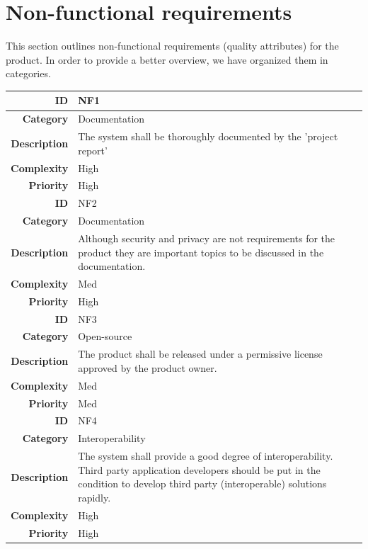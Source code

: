\newpage
\section{Non-functional requirements}
\label{section:nonfunctionalreq}

This section outlines non-functional requirements (quality attributes) for the product.
In order to provide a better overview, we have organized them in categories.


\begin{table}[H]
\begin{center}
\begin{tabular}{ | r | p{11.5cm} | }
  \hline
  
  \textbf{ID} & NF1 \\
  \hline\noalign{\smallskip}\hline
  \textbf{Category}			&	Documentation\\
  \textbf{Description}	& The system shall be thoroughly documented by the 'project report' \\
  \textbf{Complexity}		& High \\
  \textbf{Priority}			& High \\
  \hline\noalign{\smallskip}\noalign{\smallskip}\hline

  \textbf{ID} & NF2 \\
  \hline\noalign{\smallskip}\hline
  \textbf{Category}			&	Documentation\\
  \textbf{Description}	& Although security and privacy are not requirements for the product they
													are important topics to be discussed in the documentation. \\
  \textbf{Complexity}		& Med \\
  \textbf{Priority}			& High \\
  \hline\noalign{\smallskip}\noalign{\smallskip}\hline

  \textbf{ID} & NF3 \\
  \hline\noalign{\smallskip}\hline
  \textbf{Category}			&	Open-source\\
  \textbf{Description}	& The product shall be released under a permissive license approved by the product owner. \\
  \textbf{Complexity}		& Med \\
  \textbf{Priority}			& Med \\
  \hline\noalign{\smallskip}\noalign{\smallskip}\hline
  
  \textbf{ID} & NF4 \\
  \hline\noalign{\smallskip}\hline
  \textbf{Category}			&	Interoperability \\
  \textbf{Description}	& The system shall provide a good degree of interoperability.
  												Third party application developers should be put in the condition to develop
  												third party (interoperable) solutions rapidly. \\
  \textbf{Complexity}		& High \\
  \textbf{Priority}			& High \\


\end{tabular}
\end{center}
\end{table}
